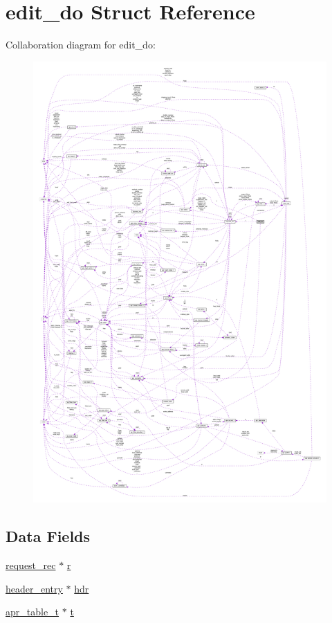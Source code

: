 \hypertarget{structedit__do}{}\section{edit\+\_\+do Struct Reference}
\label{structedit__do}


Collaboration diagram for edit\+\_\+do\+:
\nopagebreak
\begin{figure}[H]
\begin{center}
\leavevmode
\includegraphics[width=350pt]{structedit__do__coll__graph}
\end{center}
\end{figure}
\subsection*{Data Fields}
\begin{DoxyCompactItemize}
\item 
\hyperlink{structrequest__rec}{request\+\_\+rec} $\ast$ \hyperlink{structedit__do_a2bc08457a6d3b02daa06712b66c31a92}{r}
\item 
\hyperlink{structheader__entry}{header\+\_\+entry} $\ast$ \hyperlink{structedit__do_a6aeafd09b4fd3707c77367e79fbc5f89}{hdr}
\item 
\hyperlink{structapr__table__t}{apr\+\_\+table\+\_\+t} $\ast$ \hyperlink{structedit__do_af07ebab25134d17adfd45d1073fd21f9}{t}
\end{DoxyCompactItemize}


